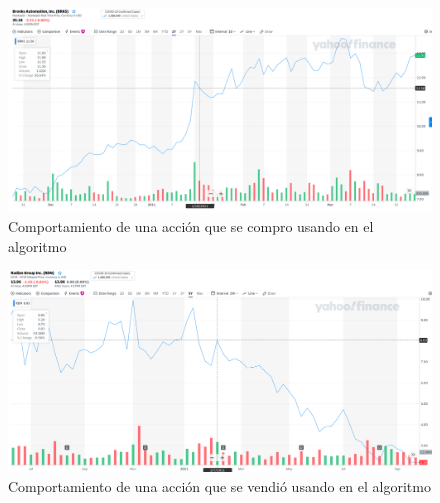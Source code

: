 \documentclass[16pt,a4paper,notitlepage,onecolumn,oneside]{article}
\begin{document}
\begin{figure}
	\centering
	\includegraphics[width=1\linewidth]{compra}
	\caption{Comportamiento de una acción que se compro usando en el algoritmo}
	\label{fig:compra}
\end{figure}
\begin{figure}
	\centering
	\includegraphics[width=1\linewidth]{venta}
	\caption{Comportamiento de una acción que se vendió usando en el algoritmo}
	\label{fig:venta}
\end{figure}
\end{document}
